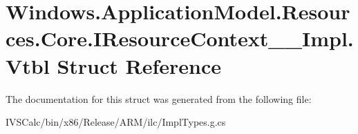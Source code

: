 \hypertarget{struct_windows_1_1_application_model_1_1_resources_1_1_core_1_1_i_resource_context_____impl_1_1_vtbl}{}\section{Windows.\+Application\+Model.\+Resources.\+Core.\+I\+Resource\+Context\+\_\+\+\_\+\+Impl.\+Vtbl Struct Reference}
\label{struct_windows_1_1_application_model_1_1_resources_1_1_core_1_1_i_resource_context_____impl_1_1_vtbl}


The documentation for this struct was generated from the following file\+:\begin{DoxyCompactItemize}
\item 
I\+V\+S\+Calc/bin/x86/\+Release/\+A\+R\+M/ilc/Impl\+Types.\+g.\+cs\end{DoxyCompactItemize}
